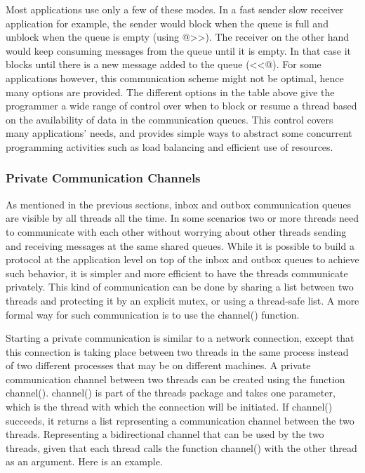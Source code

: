 \bigskip

Most applications use only a few of these modes. In a fast sender slow receiver
application for example, the sender would block when the queue is full
and unblock when the queue is empty (using
\textsf{@{\textgreater}{\textgreater}}). The receiver
on the other hand would keep consuming messages from the queue until it
is empty. In that case it blocks until there is a new message added to
the queue (\textsf{{\textless}{\textless}@}). For some
applications however, this communication scheme might not be optimal,
hence many options are provided. The different options in the table
above give the programmer a wide range of control over when to block or
resume a thread based on the availability of data in the communication
queues. This control covers many applications{\textquoteright} needs,
and provides simple ways to abstract some concurrent programming
activities such as load balancing and efficient use of resources.

\subsubsection{Private Communication Channels }

As mentioned in the previous sections, inbox and outbox communication
queues are visible by all threads all the time. In some scenarios two
or more threads need to communicate with each other without worrying
about other threads sending and receiving messages at the same shared
queues. While it is possible to build a protocol at the application
level on top of the inbox and outbox queues to achieve such behavior,
it is simpler and more efficient to have the threads communicate
privately. This kind of communication can be done by sharing a list
between two threads and protecting it by an explicit mutex, or using a
thread-safe list. A more formal way for such communication is to use
the \textsf{channel()} function. 

Starting a private communication is similar to a network connection,
except that this connection is taking place between two threads in the
same process instead of two different processes that may be on
different machines. A private communication channel between two threads
can be created using the function \textsf{channel()}.
\textsf{channel()} is part of the
\textsf{threads} package and takes one parameter, which
is the thread with which the connection will be initiated. If
\textsf{channel()} succeeds, it returns a list representing
a communication channel between the two threads. Representing a
bidirectional channel that can be used by the two threads, given that
each thread calls the function \textsf{channel()} with the
other thread as an argument. Here is an example.

